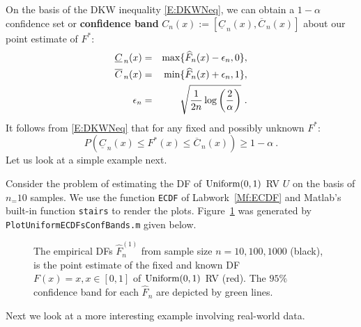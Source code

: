 On the basis of the DKW inequality \eqref{E:DKWNeq}, we can obtain a $1-\alpha$ confidence set or {\bf confidence band} $C_n(x) := [\underline{C}_{\, n}(x), \overline{C}_{\, n}(x)]$ about our point estimate of $F^*$: 
\begin{eqnarray}
\underline{C}_{\, n}(x) &=& \max \{ \widehat{F}_n(x)-\epsilon_n, 0 \}, \notag \\
\overline{C}_{\, n}(x)  &=& \min \{ \widehat{F}_n(x)+\epsilon_n, 1 \}, \notag \\
\epsilon_n &=& \sqrt{ \frac{1}{2n} \log \left( \frac{2}{\alpha}\right)} \ .
\end{eqnarray}
It follows from \eqref{E:DKWNeq} that for any fixed and possibly unknown $F^*$:
\[
P \left( \underline{C}_{\, n}(x) \leq F^*(x) \leq \overline{C}_{\, n}(x) \right) \geq 1-\alpha \ .
\]
Let us look at a simple example next.
\begin{labwork}
Consider the problem of estimating the DF of $\mbox{{\rm Uniform}}(0,1)$ RV $U$ on the basis of $n_=10$ samples.  We use the function {\tt ECDF} of Labwork~\ref*{Mf:ECDF} and {\sc Matlab}'s built-in function {\tt stairs} to render the plots.  Figure~\ref*{F:UniformECDFsBands} was generated by {\tt PlotUniformECDFsConfBands.m} given below.
{}
\begin{figure}[htpb]
\caption{The empirical DFs $\widehat{F}^{(1)}_{n}$ from sample size $n=10, 100, 1000$ (black), is the point estimate of the fixed and known DF $F(x)=x, x \in[0,1]$ of $\mbox{{\rm Uniform}}(0,1)$ RV (red).  The $95\%$ confidence band for each $\widehat{F}_n$ are depicted by green lines.  \label{F:UniformECDFsBands}}
\centering   {}
\end{figure}
\end{labwork}
Next we look at a more interesting example involving real-world data.
